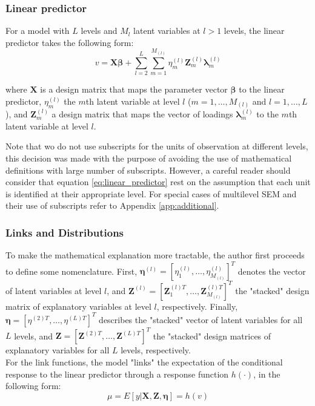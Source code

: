\subsubsection{Linear predictor}
For a model with $L$ levels and $M_{l}$ latent variables at $l>1$ levels, the linear predictor takes the following form:
\begin{equation} \label{eq:linear_predictor}
	v = \mathbf{X} \pmb{\beta} + \sum_{l=2}^{L} \sum_{m=1}^{M_{(l)}} \eta_{m}^{(l)} \mathbf{Z}_{m}^{(l)} \pmb{\lambda}_{m}^{(l)}
\end{equation}

\noindent where $\mathbf{X}$ is a design matrix that maps the parameter vector $\pmb{\beta}$ to the linear predictor, $\eta_{m}^{(l)}$ the $m$th latent variable at level $l$ ($m=1, \dots, M_{(l)}$ and $l=1, \dots, L$), and $\mathbf{Z}_{m}^{(l)}$ a design matrix that maps the vector of loadings $\pmb{\lambda}_{m}^{(l)}$ to the $m$th latent variable at level $l$.

Note that wo do not use subscripts for the units of observation at different levels, this decision was made with the purpose of avoiding the use of mathematical definitions with large number of subscripts. However, a careful reader should consider that equation \ref{eq:linear_predictor} rest on the assumption that each unit is identified at their appropriate level. For special cases of multilevel SEM and their use of subscripts refer to Appendix \ref{app:additional}.

\subsubsection{Links and Distributions}
To make the mathematical explanation more tractable, the author first proceeds to define some nomenclature. First, $\pmb{\eta}^{(l)}=[\eta_{1}^{(l)}, \dots, \eta_{M_{(l)}}^{(l)}]^{T}$ denotes the vector of latent variables at level $l$, and $\mathbf{Z}^{(l)}=[\mathbf{Z}_{1}^{(l)T}, \dots, \mathbf{Z}_{M_{(l)}}^{(l)T}]^{T}$ the "stacked" design matrix of explanatory variables at level $l$, respectively. Finally, $\pmb{\eta}=[\eta^{(2)T}, \dots, \eta^{(L)T}]^{T}$ describes the "stacked" vector of latent variables for all $L$ levels, and $\mathbf{Z}=[\mathbf{Z}^{(2)T}, \dots, \mathbf{Z}^{(L)T}]^{T}$ the "stacked" design matrices of explanatory variables for all $L$ levels, respectively. \\

For the link functions, the model "links" the expectation of the conditional response to the linear predictor through a response function $h(\cdot)$, in the following form: 
\begin{equation} \label{eq:response_function}
	\mu = E[y | \mathbf{X}, \mathbf{Z}, \pmb{\eta}] = h(v)
\end{equation}

